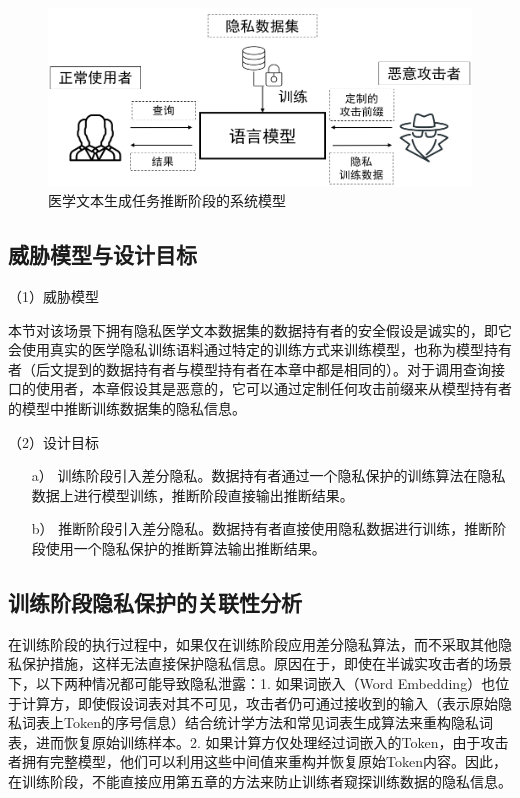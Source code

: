 \begin{figure}[h]
	\centering
	\includegraphics[width=0.7\linewidth]{figures/Chap5_Attack_Model.png}
	\caption{医学文本生成任务推断阶段的系统模型}
	\label{Chap5_Attatck_Model}
\end{figure}

\subsection{威胁模型与设计目标}

（1）威胁模型

本节对该场景下拥有隐私医学文本数据集的数据持有者的安全假设是诚实的，即它会使用真实的医学隐私训练语料通过特定的训练方式来训练模型，也称为模型持有者（后文提到的数据持有者与模型持有者在本章中都是相同的）。对于调用查询接口的使用者，本章假设其是恶意的，它可以通过定制任何攻击前缀来从模型持有者的模型中推断训练数据集的隐私信息。

（2）设计目标

\begin{itemize}
	\item [a）]
	训练阶段引入差分隐私。数据持有者通过一个隐私保护的训练算法在隐私数据上进行模型训练，推断阶段直接输出推断结果。
	\item [b）]
	推断阶段引入差分隐私。数据持有者直接使用隐私数据进行训练，推断阶段使用一个隐私保护的推断算法输出推断结果。
\end{itemize}

\subsection{训练阶段隐私保护的关联性分析}

在训练阶段的执行过程中，如果仅在训练阶段应用差分隐私算法，而不采取其他隐私保护措施，这样无法直接保护隐私信息。原因在于，即使在半诚实攻击者的场景下，以下两种情况都可能导致隐私泄露：1. 如果词嵌入（Word Embedding）也位于计算方，即使假设词表对其不可见，攻击者仍可通过接收到的输入（表示原始隐私词表上Token的序号信息）结合统计学方法和常见词表生成算法来重构隐私词表，进而恢复原始训练样本。2. 如果计算方仅处理经过词嵌入的Token，由于攻击者拥有完整模型，他们可以利用这些中间值来重构并恢复原始Token内容。因此，在训练阶段，不能直接应用第五章的方法来防止训练者窥探训练数据的隐私信息。

